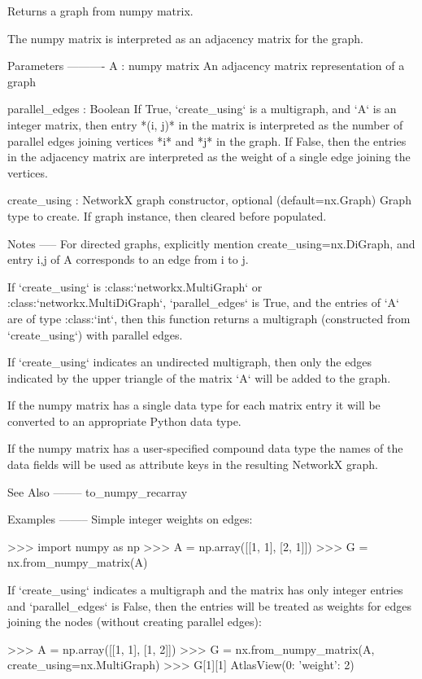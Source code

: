 \begin{DoxyVerb}Returns a graph from numpy matrix.

The numpy matrix is interpreted as an adjacency matrix for the graph.

Parameters
----------
A : numpy matrix
    An adjacency matrix representation of a graph

parallel_edges : Boolean
    If True, `create_using` is a multigraph, and `A` is an
    integer matrix, then entry *(i, j)* in the matrix is interpreted as the
    number of parallel edges joining vertices *i* and *j* in the graph.
    If False, then the entries in the adjacency matrix are interpreted as
    the weight of a single edge joining the vertices.

create_using : NetworkX graph constructor, optional (default=nx.Graph)
   Graph type to create. If graph instance, then cleared before populated.

Notes
-----
For directed graphs, explicitly mention create_using=nx.DiGraph,
and entry i,j of A corresponds to an edge from i to j.

If `create_using` is :class:`networkx.MultiGraph` or
:class:`networkx.MultiDiGraph`, `parallel_edges` is True, and the
entries of `A` are of type :class:`int`, then this function returns a
multigraph (constructed from `create_using`) with parallel edges.

If `create_using` indicates an undirected multigraph, then only the edges
indicated by the upper triangle of the matrix `A` will be added to the
graph.

If the numpy matrix has a single data type for each matrix entry it
will be converted to an appropriate Python data type.

If the numpy matrix has a user-specified compound data type the names
of the data fields will be used as attribute keys in the resulting
NetworkX graph.

See Also
--------
to_numpy_recarray

Examples
--------
Simple integer weights on edges:

>>> import numpy as np
>>> A = np.array([[1, 1], [2, 1]])
>>> G = nx.from_numpy_matrix(A)

If `create_using` indicates a multigraph and the matrix has only integer
entries and `parallel_edges` is False, then the entries will be treated
as weights for edges joining the nodes (without creating parallel edges):

>>> A = np.array([[1, 1], [1, 2]])
>>> G = nx.from_numpy_matrix(A, create_using=nx.MultiGraph)
>>> G[1][1]
AtlasView({0: {'weight': 2}})


\end{DoxyVerb}
